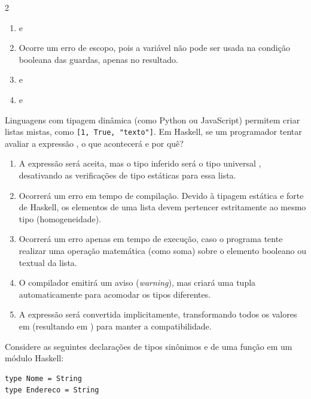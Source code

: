 \documentclass[a4paper,10pt,brazil]{article}
\begin{document}
\begin{multicols}{2}
\begin{enumerate}
  \item {} e 

  \item Ocorre um erro de escopo, pois a variável  não pode ser usada na condição booleana das guardas, apenas no resultado.

  \item {} e 

  \item {} e 


\end{enumerate}

Linguagens com tipagem dinâmica (como Python ou JavaScript) permitem criar listas mistas, como \texttt{[1, True, "texto"]}. Em Haskell, se um programador tentar avaliar a expressão , o que acontecerá e por quê?

\begin{enumerate}
  \item A expressão será aceita, mas o tipo inferido será o tipo universal , desativando as verificações de tipo estáticas para essa lista.

  \item Ocorrerá um erro em tempo de compilação. Devido à tipagem estática e forte de Haskell, os elementos de uma lista devem pertencer estritamente ao mesmo tipo (homogeneidade).

  \item Ocorrerá um erro apenas em tempo de execução, caso o programa tente realizar uma operação matemática (como soma) sobre o elemento booleano ou textual da lista.

  \item O compilador emitirá um aviso (\emph{warning}), mas criará uma tupla automaticamente para acomodar os tipos diferentes.

  \item A expressão será convertida implicitamente, transformando todos os valores em  (resultando em ) para manter a compatibilidade.


\end{enumerate}

Considere as seguintes declarações de tipos sinônimos e de uma função em um módulo Haskell:

\begin{verbatim}
type Nome = String
type Endereco = String


\end{verbatim}
\end{multicols}
\end{document}
